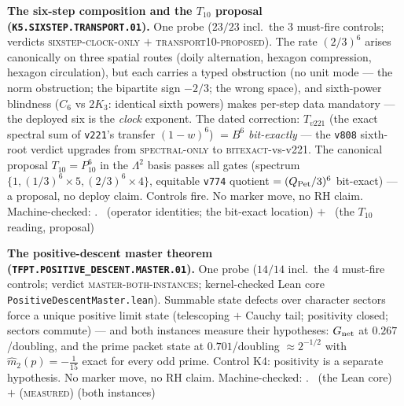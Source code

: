\documentclass[11pt,a4paper]{article}
\theoremstyle{definition}
\begin{document}
\par\smallskip\noindent\textbf{The six-step composition and the
$T_{10}$ proposal (\texttt{K5.SIXSTEP.TRANSPORT.01}).}
One probe ($23/23$ incl.\ the $3$ must-fire controls; verdicts
\textsc{sixstep-clock-only} $+$ \textsc{transport10-proposed}).
The rate $(2/3)^6$ arises canonically on three spatial routes
(doily alternation, hexagon compression, hexagon circulation), but
each carries a typed obstruction (no unit mode --- the norm
obstruction; the bipartite sign $-2/3$; the wrong space), and
sixth-power blindness ($C_6$ vs $2K_3$: identical sixth powers)
makes per-step data mandatory --- the deployed six is the
\emph{clock} exponent.  The dated correction: $T_{v221}$ (the
exact spectral sum of \texttt{v221}'s transfer $(1-w)^6$) $=B^6$
\emph{bit-exactly} --- the \texttt{v808} sixth-root verdict
upgrades from \textsc{spectral-only} to \textsc{bitexact}-vs-v221.
The canonical proposal $T_{10}=P_{10}^6$ in the $\Lambda^2$ basis
passes all gates (spectrum $\{1,(1/3)^6{\times}5,
(2/3)^6{\times}4\}$, equitable \texttt{v774} quotient
$=(Q_{\rm Pet}/3)^6$ bit-exact) --- a proposal, no deploy claim.
Controls fire.  No marker move, no RH claim.
Machine-checked: .
\mE\ (operator identities; the bit-exact location) $+$ \mC\
(the $T_{10}$ reading, proposal)
\par\smallskip

\par\smallskip\noindent\textbf{The positive-descent master theorem
(\texttt{TFPT.POSITIVE\_DESCENT.MASTER.01}).}
One probe ($14/14$ incl.\ the $4$ must-fire controls; verdict
\textsc{master-both-instances}; kernel-checked Lean core
\texttt{PositiveDescentMaster.lean}).  Summable state defects over
character sectors force a unique positive limit state (telescoping
$+$ Cauchy tail; positivity closed; sectors commute) --- and both
instances measure their hypotheses: $G_{\rm net}$ at
$0.267$/doubling, and the prime packet state at $0.701$/doubling
$\approx2^{-1/2}$ with $\hat m_2(p)=-\tfrac1{15}$ exact for every
odd prime.  Control K4: positivity is a separate hypothesis.
No marker move, no RH claim.
Machine-checked: .
\mE\ (the Lean core) $+$ (\textsc{measured}) (both instances)
\par\smallskip
\end{document}
